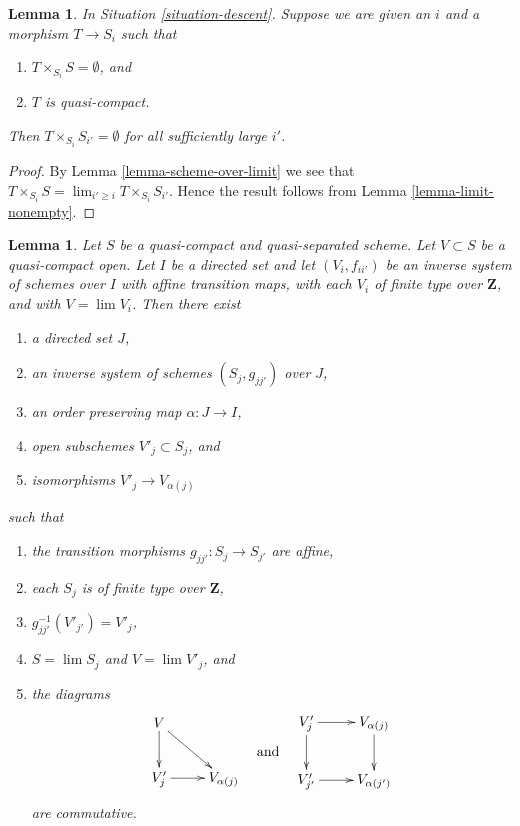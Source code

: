 \documentclass{amsart}
\theoremstyle{plain}
\newtheorem{lemma}[subsection]{Lemma}
\theoremstyle{definition}
\theoremstyle{remark}
\numberwithin{equation}{subsection}
\def\lim{\mathop{\mathrm{lim}}\nolimits}
\begin{document}
\begin{lemma}
\label{lemma-limit-fibre-product-empty}
In Situation \ref{situation-descent}.
Suppose we are given an $i$ and a morphism $T \to S_i$ such that
\begin{enumerate}
\item $T \times_{S_i} S = \emptyset$, and
\item $T$ is quasi-compact.
\end{enumerate}
Then $T \times_{S_i} S_{i'} = \emptyset$ for all sufficiently large $i'$.
\end{lemma}

\begin{proof}
By Lemma \ref{lemma-scheme-over-limit}
we see that $T \times_{S_i} S = \lim_{i' \geq i} T \times_{S_i} S_{i'}$.
Hence the result follows from
Lemma \ref{lemma-limit-nonempty}.
\end{proof}


\begin{lemma}
\label{lemma-approximate}
Let $S$ be a quasi-compact and quasi-separated scheme. Let $V \subset S$
be a quasi-compact open. Let $I$ be a directed set
and let $(V_i, f_{ii'})$ be an inverse system of schemes over $I$
with affine transition maps, with each $V_i$ of finite type over $\mathbf{Z}$,
and with $V = \lim V_i$. Then there exist
\begin{enumerate}
\item a directed set $J$,
\item an inverse system of schemes $(S_j, g_{jj'})$ over $J$,
\item an order preserving map $\alpha : J \to I$,
\item open subschemes $V'_j \subset S_j$, and
\item isomorphisms $V'_j \to V_{\alpha(j)}$
\end{enumerate}
such that
\begin{enumerate}
\item the transition morphisms $g_{jj'} : S_j \to S_{j'}$ are affine,
\item each $S_j$ is of finite type over $\mathbf{Z}$,
\item $g_{jj'}^{-1}(V'_{j'}) = V'_j$,
\item $S = \lim S_j$ and $V = \lim V'_j$, and
\item the diagrams
$$
\vcenter{
\xymatrix{
V \ar[d] \ar[rd] \\
V'_j \ar[r] & V_{\alpha(j)}
}
}
\quad\text{and}\quad
\vcenter{
\xymatrix{
V'_j \ar[r] \ar[d] & V_{\alpha(j)} \ar[d] \\
V'_{j'} \ar[r] & V_{\alpha(j')}
}
}
$$
are commutative.
\end{enumerate}
\end{lemma}
\end{document}
